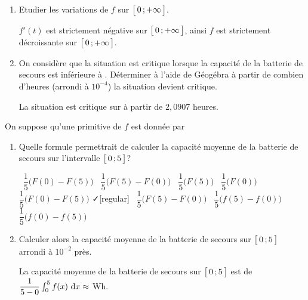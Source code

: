 \begin{enumerate}[resume=monDS]

        \item Etudier les variations de $f$ sur $\bigl[ \, 0 \, ; +\infty \,\bigl]$.
        \begin{blocvisiblex}[height=5]
        {\quad}
        $f'(t)$ est strictement négative sur $\bigl[ \, 0 \, ; +\infty \,\bigl]$, ainsi $f$ est strictement décroissante sur $\bigl[ \, 0 \, ; +\infty \,\bigl]$.

         \end{blocvisiblex}

         \medskip
         \item On considère que la situation est critique lorsque la capacité de la batterie de secours est inférieure à . Déterminer à l'aide de Géogébra à partir de combien d'heures (arrondi à $10^{-4}$) la situation devient critique.
            \begin{blocvisiblex}[height=1.2]
            {\quad}
            La situation est critique sur à partir de $2,0907$ heures.
             \end{blocvisiblex}
\end{enumerate}

             \medskip
             On suppose qu'une primitive de $f$ est donnée par 
\begin{enumerate}[resume=monDS]

             \medskip

                 \item Quelle formule permettrait de calculer la capacité moyenne de la batterie de secours sur l'intervalle $\bigl[ \, 0 \, ; 5 \,\bigl]$?
                    \begin{blocvisiblex}[height=1.5]
    {
    \faSquare[regular] \, $\dfrac{1}{5}\big(F(0) - F(5)\big)$ \hfill \faSquare[regular] \, $\dfrac{1}{5}\big(F(5) - F(0)\big)$ \hfill \faSquare[regular] \, $\dfrac{1}{5}\big(F(5)\big)$ \hfill \faSquare[regular] \, $\dfrac{1}{5}\big(F(0)\big)$ \hspace{1cm} 
 }         
    \faSquare[regular] \, $\dfrac{1}{5}\big(F(0) - F(5)\big)$ \hfill \faCheck[regular] \, $\dfrac{1}{5}\big(F(5) - F(0)\big)$ \hfill \faSquare[regular] \, $\dfrac{1}{5}\big(f(5)-f(0)\big)$ \hfill \faSquare[regular] \, $\dfrac{1}{5}\big(f(0)-f(5)\big)$ \hspace{1cm} 
    \end{blocvisiblex}

                 \medskip
                 \item Calculer alors la capacité moyenne de la batterie de secours sur $\bigl[ \, 0 \, ; 5 \,\bigl]$ arrondi à $10^{-2}$ près.
                    \begin{blocvisiblex}[height=1.5]
                    {\quad}
                    La capacité moyenne de la batterie de secours sur $\bigl[ \, 0 \, ; 5 \,\bigl]$ est de $\dfrac{1}{5-0}\int_0^5 f(x) \, \,\mathrm{d}x\approx $ Wh.
                     \end{blocvisiblex}
            
    \end{enumerate}


